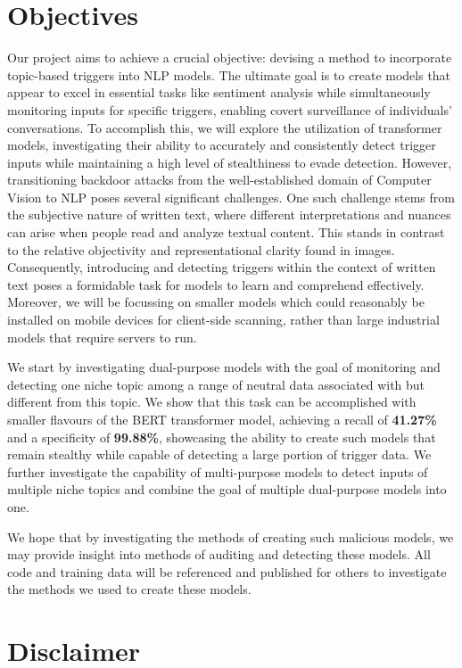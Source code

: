 \section{Objectives}

Our project aims to achieve a crucial objective: devising a method to incorporate topic-based triggers into NLP models. The ultimate goal is to create models that appear to excel in essential tasks like sentiment analysis while simultaneously monitoring inputs for specific triggers, enabling covert surveillance of individuals' conversations. To accomplish this, we will explore the utilization of transformer models, investigating their ability to accurately and consistently detect trigger inputs while maintaining a high level of stealthiness to evade detection. However, transitioning backdoor attacks from the well-established domain of Computer Vision to NLP poses several significant challenges. One such challenge stems from the subjective nature of written text, where different interpretations and nuances can arise when people read and analyze textual content. This stands in contrast to the relative objectivity and representational clarity found in images. Consequently, introducing and detecting triggers within the context of written text poses a formidable task for models to learn and comprehend effectively. Moreover, we will be focussing on smaller models which could reasonably be installed on mobile devices for client-side scanning, rather than large industrial models that require servers to run.

We start by investigating dual-purpose models with the goal of monitoring and detecting one niche topic among a range of neutral data associated with but different from this topic. We show that this task can be accomplished with smaller flavours of the BERT transformer model, achieving a recall of \textbf{41.27\%} and a specificity of \textbf{99.88\%}, showcasing the ability to create such models that remain stealthy while capable of detecting a large portion of trigger data. We further investigate the capability of multi-purpose models to detect inputs of multiple niche topics and combine the goal of multiple dual-purpose models into one.

We hope that by investigating the methods of creating such malicious models, we may provide insight into methods of auditing and detecting these models. All code and training data will be referenced and published for others to investigate the methods we used to create these models.

\section{Disclaimer}

